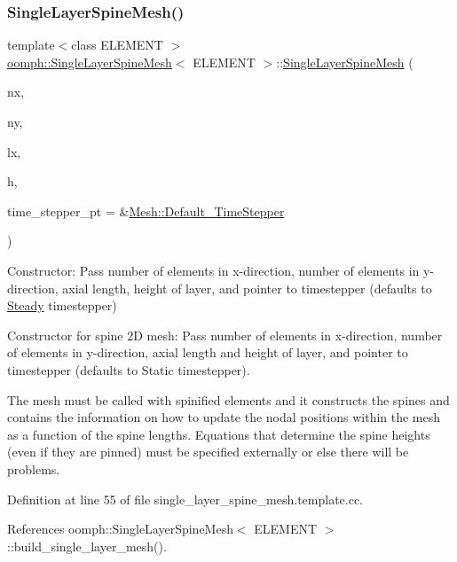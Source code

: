 \subsubsection{\texorpdfstring{Single\+Layer\+Spine\+Mesh()}{SingleLayerSpineMesh()}\hspace{0.1cm}{\footnotesize\ttfamily [1/2]}}
{\footnotesize\ttfamily template$<$class E\+L\+E\+M\+E\+NT $>$ \\
\hyperlink{classoomph_1_1SingleLayerSpineMesh}{oomph\+::\+Single\+Layer\+Spine\+Mesh}$<$ E\+L\+E\+M\+E\+NT $>$\+::\hyperlink{classoomph_1_1SingleLayerSpineMesh}{Single\+Layer\+Spine\+Mesh} (\begin{DoxyParamCaption}\item[{const unsigned \&}]{nx,  }\item[{const unsigned \&}]{ny,  }\item[{const double \&}]{lx,  }\item[{const double \&}]{h,  }\item[{\hyperlink{classoomph_1_1TimeStepper}{Time\+Stepper} $\ast$}]{time\+\_\+stepper\+\_\+pt = {\ttfamily \&\hyperlink{classoomph_1_1Mesh_a12243d0fee2b1fcee729ee5a4777ea10}{Mesh\+::\+Default\+\_\+\+Time\+Stepper}} }\end{DoxyParamCaption})}



Constructor\+: Pass number of elements in x-\/direction, number of elements in y-\/direction, axial length, height of layer, and pointer to timestepper (defaults to \hyperlink{classoomph_1_1Steady}{Steady} timestepper) 

Constructor for spine 2D mesh\+: Pass number of elements in x-\/direction, number of elements in y-\/direction, axial length and height of layer, and pointer to timestepper (defaults to Static timestepper).

The mesh must be called with spinified elements and it constructs the spines and contains the information on how to update the nodal positions within the mesh as a function of the spine lengths. Equations that determine the spine heights (even if they are pinned) must be specified externally or else there will be problems. 

Definition at line 55 of file single\+\_\+layer\+\_\+spine\+\_\+mesh.\+template.\+cc.



References oomph\+::\+Single\+Layer\+Spine\+Mesh$<$ E\+L\+E\+M\+E\+N\+T $>$\+::build\+\_\+single\+\_\+layer\+\_\+mesh().

\mbox{\label{classoomph_1_1SingleLayerSpineMesh_afb908e31d988eaa930e949a54eeea37f}} 

